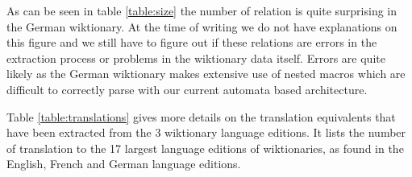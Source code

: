 \documentclass[10pt, a4paper]{article}
\begin{document}

As can be seen in table \ref{table:size} the number of relation is quite surprising in the German wiktionary. At the time of writing we do not have explanations on this figure and we still have to figure out if these relations are errors in the extraction process or problems in the wiktionary data itself. Errors are quite likely as the German wiktionary makes extensive use of nested macros which are difficult to correctly parse with our current automata based architecture.

Table \ref{table:translations} gives more details on the translation equivalents that have been extracted from the 3 wiktionary language editions. It lists the number of translation to the 17 largest language editions of wiktionaries, as found in the English, French and German language editions.
\end{document}
